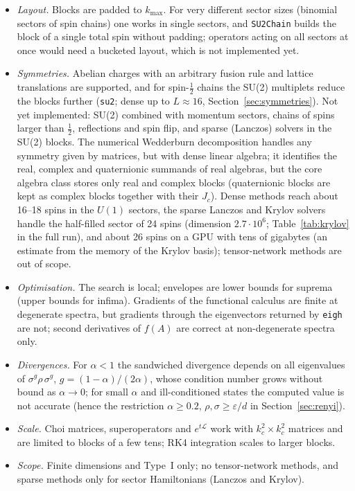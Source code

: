 \documentclass[11pt]{article}
\begin{document}
\begin{itemize}
\item \emph{Layout.} Blocks are padded to $k_{\max}$. For very different sector sizes (binomial sectors of
spin chains) one works in single sectors, and \texttt{SU2Chain} builds the block of a single total spin without
padding; operators acting on all sectors at once would need a bucketed layout, which is not implemented yet.
\item \emph{Symmetries.} Abelian charges with an arbitrary fusion rule and lattice translations are
supported, and for spin-$\frac12$ chains the SU(2) multiplets reduce the blocks further (\texttt{su2}; dense up to
$L\approx16$, Section~\ref{sec:symmetries}). Not yet implemented: SU(2) combined with momentum sectors, chains of
spins larger than $\frac12$, reflections and spin flip, and sparse (Lanczos) solvers in the SU(2) blocks. The
numerical Wedderburn decomposition handles any symmetry given by matrices, but with dense linear algebra; it
identifies the real, complex and quaternionic summands of real algebras, but the core algebra class stores only real
and complex blocks (quaternionic blocks are kept as complex blocks together with their $J_c$). Dense methods reach about 16--18 spins
in the $U(1)$ sectors, the sparse Lanczos and
Krylov solvers handle the half-filled sector of 24 spins (dimension $2.7\cdot10^6$; Table~\ref{tab:krylov} in the
full run), and about 26 spins on a GPU with tens of gigabytes (an estimate from the memory of the Krylov basis); tensor-network methods are out of
scope.
\item \emph{Optimisation.} The search is local; envelopes are lower bounds for suprema (upper bounds for
infima). Gradients of the functional calculus are finite at degenerate spectra, but gradients through the
eigenvectors returned by \texttt{eigh} are not;
second derivatives of $f(A)$ are correct at non-degenerate spectra only.
\item \emph{Divergences.} For $\alpha<1$ the sandwiched divergence depends on all eigenvalues of
$\sigma^g\rho\,\sigma^g$, $g=(1-\alpha)/(2\alpha)$, whose condition number grows without bound as $\alpha\to0$; for small $\alpha$ and ill-conditioned states the computed value is not accurate (hence the restriction
$\alpha\ge0.2$, $\rho,\sigma\ge\varepsilon/d$ in Section~\ref{sec:renyi}).
\item \emph{Scale.} Choi matrices, superoperators and $e^{t\mathcal L}$ work with $k_c^2\times k_c^2$
matrices and are limited to blocks of a few tens; RK4 integration scales to larger blocks.
\item \emph{Scope.} Finite dimensions and Type~I only; no tensor-network methods, and sparse methods only for
sector Hamiltonians (Lanczos and Krylov).
\end{itemize}
\end{document}
